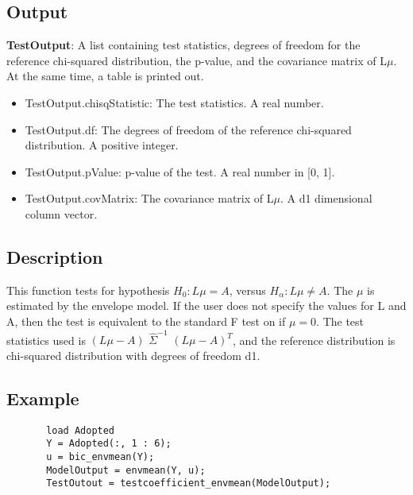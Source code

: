 \documentclass[a4paper,11pt,openany]{memoir}
\begin{document}
\subsection*{Output}

\begin{par}
\textbf{TestOutput}: A list containing test statistics, degrees of freedom for the reference chi-squared distribution, the p-value, and the covariance matrix of L$\mu$.  At the same time, a table is printed out.
\end{par} \vspace{1em}
\begin{itemize}
\setlength{\itemsep}{-1ex}
   \item TestOutput.chisqStatistic: The test statistics. A real number.
   \item TestOutput.df: The degrees of freedom of the reference chi-squared distribution.  A positive integer.
   \item TestOutput.pValue: p-value of the test.  A real number in [0, 1].
   \item TestOutput.covMatrix: The covariance matrix of L$\mu$. A d1 dimensional column vector.
\end{itemize}


\subsection*{Description}

\begin{par}
This function tests for hypothesis $H_0: L\mu = A$, versus $H_\alpha: L\mu\neq A$.  The $\mu$ is estimated by the envelope model.  If the user does not specify the values for L and A, then the test is equivalent to the standard F test on if $\mu = 0$.  The test statistics used is $(L\mu - A)$ $\hat{\Sigma}^{-1}$ $(L\mu - A)^{T}$, and the reference distribution is chi-squared distribution with degrees of freedom d1.
\end{par} \vspace{1em}


\subsection*{Example}


\begin{verbatim}       load Adopted
       Y = Adopted(:, 1 : 6);
       u = bic_envmean(Y);
       ModelOutput = envmean(Y, u);
       TestOutout = testcoefficient_envmean(ModelOutput);\end{verbatim}
    
\end{document}
